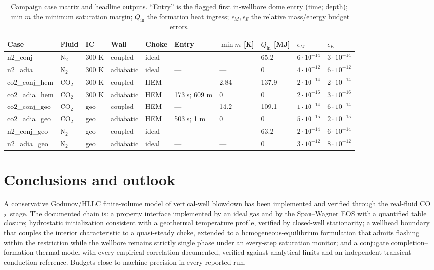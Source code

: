 \documentclass[11pt]{article}
\newcommand{\co}{CO$_2$}
\begin{document}
\begin{table}[htb]
\centering
\caption{Campaign case matrix and headline outputs. ``Entry'' is the
flagged first in-wellbore dome entry (time; depth); $\min m$ the
minimum saturation margin; $Q_{\mathrm{in}}$ the formation heat
ingress; $\epsilon_M, \epsilon_E$ the relative mass/energy budget
errors.}
\label{tab:cases}
\scriptsize
\begin{tabular}{llllllllll}
\toprule
Case & Fluid & IC & Wall & Choke & Entry & $\min m$ [K] &
$Q_{\mathrm{in}}$ [MJ] & $\epsilon_M$ & $\epsilon_E$\\
\midrule
n2\_conj & N$_2$ & 300 K & coupled & ideal & --- & --- & 65.2 &
$6{\cdot}10^{-14}$ & $3{\cdot}10^{-14}$\\
n2\_adia & N$_2$ & 300 K & adiabatic & ideal & --- & --- & 0 &
$4{\cdot}10^{-12}$ & $6{\cdot}10^{-12}$\\
co2\_conj\_hem & \co & 300 K & coupled & HEM & --- & 2.84 & 137.9 &
$2{\cdot}10^{-14}$ & $2{\cdot}10^{-14}$\\
co2\_adia\_hem & \co & 300 K & adiabatic & HEM & 173 s; 609 m & 0 &
0 & $2{\cdot}10^{-16}$ & $3{\cdot}10^{-16}$\\
co2\_conj\_geo & \co & geo & coupled & HEM & --- & 14.2 & 109.1 &
$1{\cdot}10^{-14}$ & $6{\cdot}10^{-14}$\\
co2\_adia\_geo & \co & geo & adiabatic & HEM & 503 s; 1 m & 0 & 0 &
$5{\cdot}10^{-15}$ & $2{\cdot}10^{-15}$\\
n2\_conj\_geo & N$_2$ & geo & coupled & ideal & --- & --- & 63.2 &
$2{\cdot}10^{-14}$ & $6{\cdot}10^{-14}$\\
n2\_adia\_geo & N$_2$ & geo & adiabatic & ideal & --- & --- & 0 &
$3{\cdot}10^{-12}$ & $8{\cdot}10^{-12}$\\
\bottomrule
\end{tabular}
\end{table}

\section{Conclusions and outlook}
\label{sec:outlook}

A conservative Godunov/HLLC finite-volume model of vertical-well
blowdown has been implemented and verified through the real-fluid
\co\ stage. The documented chain is: a property interface implemented
by an ideal gas and by the Span--Wagner EOS with a quantified table
closure; hydrostatic initialization consistent with a geothermal
temperature profile, verified by closed-well stationarity; a wellhead
boundary that couples the interior characteristic to a quasi-steady
choke, extended to a homogeneous-equilibrium formulation that admits
flashing within the restriction while the wellbore remains strictly
single phase under an every-step saturation monitor; and a conjugate
completion--formation thermal model with every empirical correlation
documented, verified against analytical limits and an independent
transient-conduction reference. Budgets close to machine precision in
every reported run.
\end{document}
